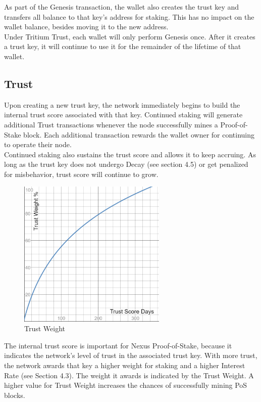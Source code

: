 \documentclass[11pt]{article}
\begin{document}
\noindent As part of the Genesis transaction, the wallet also creates the trust key and transfers all balance to that key's address for staking. This has no impact on the wallet balance, besides moving it to the new address.\\

\noindent Under Tritium Trust, each wallet will only perform Genesis once. After it creates a trust key, it will continue to use it for the remainder of the lifetime of that wallet.\\


\subsection{Trust}
Upon creating a new trust key, the network immediately begins to build the internal trust score associated with that key. Continued staking will generate additional Trust transactions whenever the node successfully mines a Proof-of-Stake block. Each additional transaction rewards the wallet owner for continuing to operate their node.\\

\noindent Continued staking also sustains the trust score and allows it to keep accruing. As long as the trust key does not undergo Decay (see section 4.5) or get penalized for misbehavior, trust score will continue to grow.\\

\begin{figure}[h!]
    \centering
    \includegraphics[width=0.63\textwidth]{images/trustWeight.png}
    \caption{Trust Weight \label{fig:trustWeight}}
\end{figure}

\noindent The internal trust score is important for Nexus Proof-of-Stake, because it indicates the network's level of trust in the associated trust key. With more trust, the network awards that key a higher weight for staking and a higher Interest Rate (see Section 4.3). The weight it awards is indicated by the Trust Weight. A higher value for Trust Weight increases the chances of successfully mining PoS blocks.\\
\end{document}
